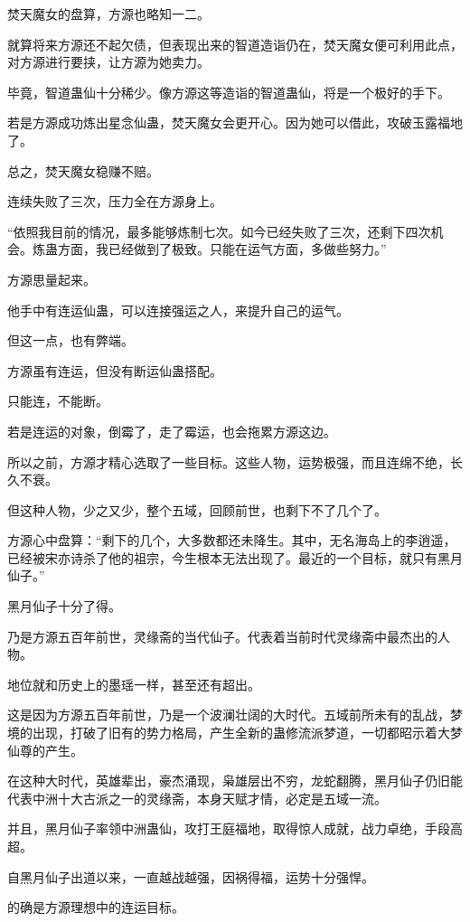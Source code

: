 \begin{this_body}
焚天魔女的盘算，方源也略知一二。

就算将来方源还不起欠债，但表现出来的智道造诣仍在，焚天魔女便可利用此点，对方源进行要挟，让方源为她卖力。

毕竟，智道蛊仙十分稀少。像方源这等造诣的智道蛊仙，将是一个极好的手下。

若是方源成功炼出星念仙蛊，焚天魔女会更开心。因为她可以借此，攻破玉露福地了。

总之，焚天魔女稳赚不赔。

连续失败了三次，压力全在方源身上。

“依照我目前的情况，最多能够炼制七次。如今已经失败了三次，还剩下四次机会。炼蛊方面，我已经做到了极致。只能在运气方面，多做些努力。”

方源思量起来。

他手中有连运仙蛊，可以连接强运之人，来提升自己的运气。

但这一点，也有弊端。

方源虽有连运，但没有断运仙蛊搭配。

只能连，不能断。

若是连运的对象，倒霉了，走了霉运，也会拖累方源这边。

所以之前，方源才精心选取了一些目标。这些人物，运势极强，而且连绵不绝，长久不衰。

但这种人物，少之又少，整个五域，回顾前世，也剩下不了几个了。

方源心中盘算：“剩下的几个，大多数都还未降生。其中，无名海岛上的李逍遥，已经被宋亦诗杀了他的祖宗，今生根本无法出现了。最近的一个目标，就只有黑月仙子。”

黑月仙子十分了得。

乃是方源五百年前世，灵缘斋的当代仙子。代表着当前时代灵缘斋中最杰出的人物。

地位就和历史上的墨瑶一样，甚至还有超出。

这是因为方源五百年前世，乃是一个波澜壮阔的大时代。五域前所未有的乱战，梦境的出现，打破了旧有的势力格局，产生全新的蛊修流派梦道，一切都昭示着大梦仙尊的产生。

在这种大时代，英雄辈出，豪杰涌现，枭雄层出不穷，龙蛇翻腾，黑月仙子仍旧能代表中洲十大古派之一的灵缘斋，本身天赋才情，必定是五域一流。

并且，黑月仙子率领中洲蛊仙，攻打王庭福地，取得惊人成就，战力卓绝，手段高超。

自黑月仙子出道以来，一直越战越强，因祸得福，运势十分强悍。

的确是方源理想中的连运目标。

\end{this_body}

